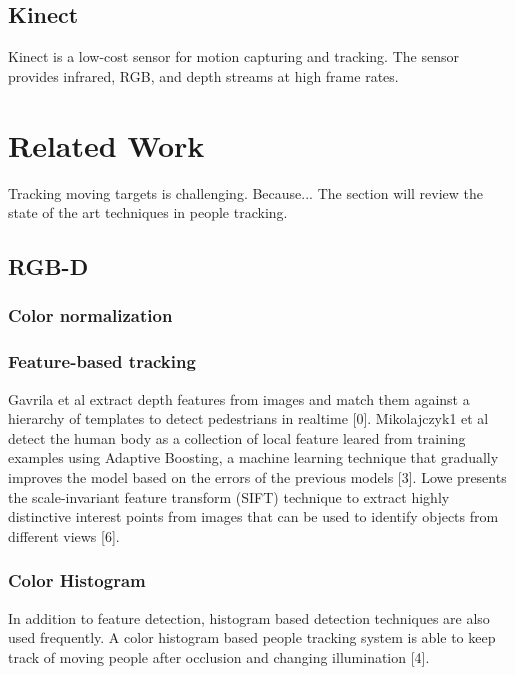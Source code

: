 \documentclass[paper=a4, fontsize=11pt]{scrartcl}
\numberwithin{equation}{section}		%
\numberwithin{figure}{section}			%
\numberwithin{table}{section}				%
\begin{document}
\subsection{Kinect}

Kinect is a low-cost sensor for motion capturing and tracking. The sensor provides infrared, RGB, and depth streams at high frame rates.

\section{Related Work}

Tracking moving targets is challenging. Because... The section will review the state of the art techniques in people tracking.

\subsection{RGB-D}





\subsubsection{Color normalization}



\subsubsection{Feature-based tracking}

Gavrila et al extract depth features from images and match them against a hierarchy of templates to detect pedestrians in realtime [0]. Mikolajczyk1 et al detect the human body as a collection of local feature leared from training examples using Adaptive Boosting, a machine learning technique that gradually improves the model based on the errors of the previous models [3]. Lowe presents the scale-invariant feature transform (SIFT) technique to extract highly distinctive interest points from images that can be used to identify objects from different views [6].

\subsubsection{Color Histogram}
In addition to feature detection, histogram based detection techniques are also used frequently. A color histogram based people tracking system is able to keep track of moving people after occlusion and changing illumination [4].  
\end{document}
